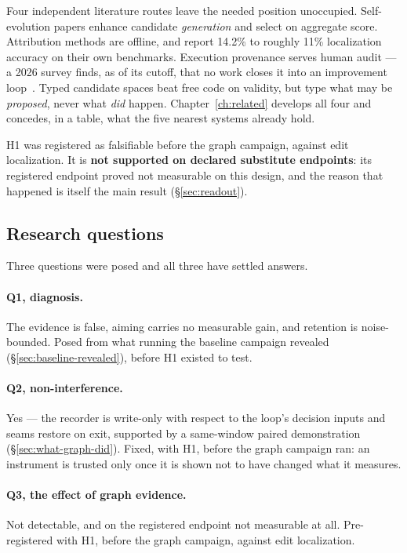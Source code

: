 Four independent literature routes leave the needed position unoccupied.
Self-evolution papers enhance candidate \emph{generation} and select on
aggregate score. Attribution methods are offline, and report 14.2\% to
roughly 11\% localization accuracy on their own benchmarks. Execution
provenance serves human audit --- a 2026 survey finds, as of its cutoff,
that no work closes it into an improvement loop~\cite{survey-provenance}.
Typed candidate spaces beat free code on validity, but type what may be
\emph{proposed}, never what \emph{did} happen. Chapter~\ref{ch:related}
develops all four and concedes, in a table, what the five nearest systems
already hold.

H1 was registered as falsifiable before the graph campaign, against edit
localization. It is \textbf{not supported on declared substitute
endpoints}: its registered endpoint proved not measurable on this design,
and the reason that happened is itself the main result
(\S\ref{sec:readout}).

\subsection*{Research questions}
\label{sec:research-questions}

Three questions were posed and all three have settled answers.

\paragraph{Q1, diagnosis.}\label{rq:1} The evidence is false, aiming
carries no measurable gain, and retention is noise-bounded. Posed from
what running the baseline campaign revealed (\S\ref{sec:baseline-revealed}),
before H1 existed to test.

\paragraph{Q2, non-interference.}\label{rq:2} Yes --- the recorder is
write-only with respect to the loop's decision inputs and seams restore on
exit, supported by a same-window paired demonstration
(\S\ref{sec:what-graph-did}). Fixed, with H1, before the graph campaign
ran: an instrument is trusted only once it is shown not to have changed
what it measures.

\paragraph{Q3, the effect of graph evidence.}\label{rq:3} Not detectable,
and on the registered endpoint not measurable at all. Pre-registered with
H1, before the graph campaign, against edit localization.

